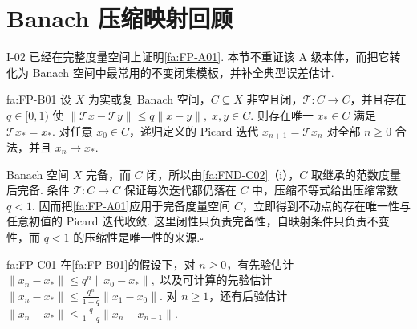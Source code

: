 \section{Banach 压缩映射回顾}\label{sec:iii03-banach}

I-02 已经在完整度量空间上证明\autoref{fa:FP-A01}. 本节不重证该 A 级本体，而把它转化为 Banach 空间中最常用的不变闭集模板，并补全典型误差估计.

\begin{FATheorem}{fa:FP-B01}
设 \(\displaystyle X\) 为实或复 Banach 空间，\(\displaystyle C\subseteq X\) 非空且闭，\(\displaystyle \mathcal T:C\to C\)，并且存在 \(\displaystyle q\in[0,1)\) 使
\(\displaystyle \|\mathcal T x-\mathcal T y\| \leqslant q\|x-y\|, \; x,y\in C.\)
则存在唯一 \(\displaystyle x_*\in C\) 满足 \(\displaystyle \mathcal T x_*=x_*\). 对任意 \(\displaystyle x_0\in C\)，递归定义的 Picard 迭代 \(\displaystyle x_{n+1}=\mathcal T x_n\) 对全部 \(\displaystyle n\geqslant0\) 合法，并且 \(\displaystyle x_n\to x_*\).
\end{FATheorem}

\begin{FAProof}
Banach 空间 \(\displaystyle X\) 完备，而 \(\displaystyle C\) 闭，所以由\autoref{fa:FND-C02}（i），\(\displaystyle C\) 取继承的范数度量后完备. 条件 \(\displaystyle \mathcal T:C\to C\) 保证每次迭代都仍落在 \(\displaystyle C\) 中，压缩不等式给出压缩常数 \(\displaystyle q<1\). 因而把\autoref{fa:FP-A01}应用于完备度量空间 \(\displaystyle C\)，立即得到不动点的存在唯一性与任意初值的 Picard 迭代收敛. 这里闭性只负责完备性，自映射条件只负责不变性，而 \(\displaystyle q<1\) 的压缩性是唯一性的来源.\hfill\(\square\)

\end{FAProof}

\begin{FATheorem}{fa:FP-C01}
在\autoref{fa:FP-B01}的假设下，对 \(\displaystyle n\geqslant0\)，有先验估计
\(\displaystyle \|x_n-x_*\| \leqslant q^n\|x_0-x_*\|,\)
以及可计算的先验估计
\(\displaystyle \|x_n-x_*\| \leqslant \frac{q^n}{1-q}\|x_1-x_0\|.\)
对 \(\displaystyle n\geqslant1\)，还有后验估计
\(\displaystyle \|x_n-x_*\| \leqslant \frac{q}{1-q}\|x_n-x_{n-1}\|.\)
\end{FATheorem}

